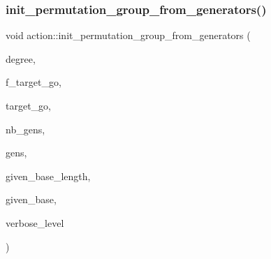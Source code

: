 \mbox{\label{classaction_a3a42b109a29b27228d934e00b9a2eec5}} 
\subsubsection{\texorpdfstring{init\+\_\+permutation\+\_\+group\+\_\+from\+\_\+generators()}{init\_permutation\_group\_from\_generators()}}
{\footnotesize\ttfamily void action\+::init\+\_\+permutation\+\_\+group\+\_\+from\+\_\+generators (\begin{DoxyParamCaption}\item[{\mbox{\hyperlink{galois_8h_a09fddde158a3a20bd2dcadb609de11dc}{I\+NT}}}]{degree,  }\item[{\mbox{\hyperlink{galois_8h_a09fddde158a3a20bd2dcadb609de11dc}{I\+NT}}}]{f\+\_\+target\+\_\+go,  }\item[{\mbox{\hyperlink{classlonginteger__object}{longinteger\+\_\+object}} \&}]{target\+\_\+go,  }\item[{\mbox{\hyperlink{galois_8h_a09fddde158a3a20bd2dcadb609de11dc}{I\+NT}}}]{nb\+\_\+gens,  }\item[{\mbox{\hyperlink{galois_8h_a09fddde158a3a20bd2dcadb609de11dc}{I\+NT}} $\ast$}]{gens,  }\item[{\mbox{\hyperlink{galois_8h_a09fddde158a3a20bd2dcadb609de11dc}{I\+NT}}}]{given\+\_\+base\+\_\+length,  }\item[{\mbox{\hyperlink{galois_8h_a09fddde158a3a20bd2dcadb609de11dc}{I\+NT}} $\ast$}]{given\+\_\+base,  }\item[{\mbox{\hyperlink{galois_8h_a09fddde158a3a20bd2dcadb609de11dc}{I\+NT}}}]{verbose\+\_\+level }\end{DoxyParamCaption})}

\mbox{\label{classaction_ad943cb9d3828331bf5634c6dbfc31afd}} 
